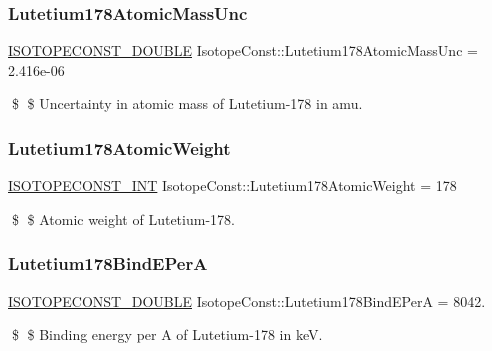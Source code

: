 \subsubsection{\texorpdfstring{Lutetium178\+Atomic\+Mass\+Unc}{Lutetium178AtomicMassUnc}}
{\footnotesize\ttfamily \mbox{\hyperlink{group___isotope_const-_macros_ga8f45a7272ce02c0b4c65c44636ed719a}{I\+S\+O\+T\+O\+P\+E\+C\+O\+N\+S\+T\+\_\+\+D\+O\+U\+B\+LE}} Isotope\+Const\+::\+Lutetium178\+Atomic\+Mass\+Unc = 2.\+416e-\/06}

\$ \$ Uncertainty in atomic mass of Lutetium-\/178 in amu. \mbox{\label{group___isotope_const-_lutetium-_lu178_gadbc6fc0bc04451ffd50d240582ad3315}} 
\subsubsection{\texorpdfstring{Lutetium178\+Atomic\+Weight}{Lutetium178AtomicWeight}}
{\footnotesize\ttfamily \mbox{\hyperlink{group___isotope_const-_macros_ga5f18360b3e99483a35c32d789e62621c}{I\+S\+O\+T\+O\+P\+E\+C\+O\+N\+S\+T\+\_\+\+I\+NT}} Isotope\+Const\+::\+Lutetium178\+Atomic\+Weight = 178}

\$ \$ Atomic weight of Lutetium-\/178. \mbox{\label{group___isotope_const-_lutetium-_lu178_ga0c23d410a4ea267cc2fa2f23b1557e84}} 
\subsubsection{\texorpdfstring{Lutetium178\+Bind\+E\+PerA}{Lutetium178BindEPerA}}
{\footnotesize\ttfamily \mbox{\hyperlink{group___isotope_const-_macros_ga8f45a7272ce02c0b4c65c44636ed719a}{I\+S\+O\+T\+O\+P\+E\+C\+O\+N\+S\+T\+\_\+\+D\+O\+U\+B\+LE}} Isotope\+Const\+::\+Lutetium178\+Bind\+E\+PerA = 8042.}

\$ \$ Binding energy per A of Lutetium-\/178 in keV. \mbox{\label{group___isotope_const-_lutetium-_lu178_ga9d18ff1aee3ec11135a192b8f1ec53c0}} 
